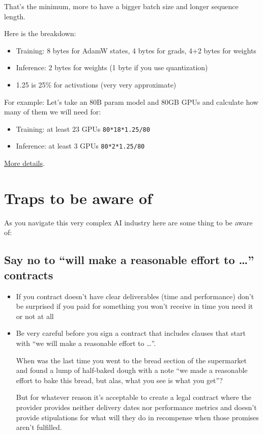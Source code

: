 \documentclass[
]{report}
\providecommand{\tightlist}{%
  \setlength{\itemsep}{0pt}\setlength{\parskip}{0pt}}\usepackage{longtable,booktabs,array}
\begin{document}
That's the minimum, more to have a bigger batch size and longer sequence
length.

Here is the breakdown:

\begin{itemize}
\item
  Training: 8 bytes for AdamW states, 4 bytes for grads, 4+2 bytes for
  weights
\item
  Inference: 2 bytes for weights (1 byte if you use quantization)
\item
  1.25 is 25\% for activations (very very approximate)
\end{itemize}

For example: Let's take an 80B param model and 80GB GPUs and calculate
how many of them we will need for:

\begin{itemize}
\tightlist
\item
  Training: at least 23 GPUs \texttt{80*18*1.25/80}
\item
  Inference: at least 3 GPUs \texttt{80*2*1.25/80}
\end{itemize}

\href{../training/performance/README.md\#anatomy-of-models-memory-usage}{More
details}.

\section{Traps to be aware of}\label{traps-to-be-aware-of}

As you navigate this very complex AI industry here are some thing to be
aware of:

\subsection{\texorpdfstring{Say no to ``will make a reasonable effort to
\ldots{}''
contracts}{Say no to ``will make a reasonable effort to \ldots'' contracts}}\label{say-no-to-will-make-a-reasonable-effort-to-contracts}

\begin{itemize}
\item
  If you contract doesn't have clear deliverables (time and performance)
  don't be surprised if you paid for something you won't receive in time
  you need it or not at all
\item
  Be very careful before you sign a contract that includes clauses that
  start with ``we will make a reasonable effort to \ldots{}''.

  When was the last time you went to the bread section of the
  supermarket and found a lump of half-baked dough with a note ``we made
  a reasonable effort to bake this bread, but alas, what you see is what
  you get''?

  But for whatever reason it's acceptable to create a legal contract
  where the provider provides neither delivery dates nor performance
  metrics and doesn't provide stipulations for what will they do in
  recompense when those promises aren't fulfilled.
\end{itemize}
\end{document}
